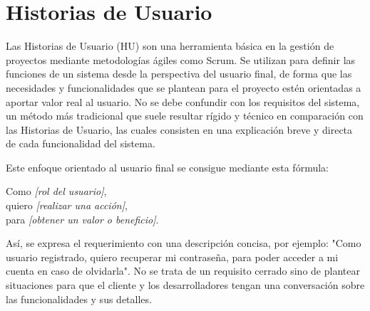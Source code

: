 ﻿\section{Historias de Usuario}

Las Historias de Usuario (HU) son una herramienta básica en la gestión de proyectos mediante metodologías ágiles como Scrum. Se utilizan para definir las funciones de un sistema desde la perspectiva del usuario final, de forma que las necesidades y funcionalidades que se plantean para el proyecto estén orientadas a aportar valor real al usuario. No se debe confundir con los requisitos del sistema, un método más tradicional que suele resultar rígido y técnico en comparación con las Historias de Usuario, las cuales consisten en una explicación breve y directa de cada funcionalidad del sistema.\cite{atlassian_user_stories}

Este enfoque orientado al usuario final se consigue mediante esta fórmula:

    \indent \indent Como \textit{[rol del usuario]}, \\
    \indent \indent quiero \textit{[realizar una acción]}, \\
    \indent \indent para \textit{[obtener un valor o beneficio]}.


Así, se expresa el requerimiento con una descripción concisa, por ejemplo: "Como usuario registrado, quiero recuperar mi contraseña, para poder acceder a mi cuenta en caso de olvidarla". No se trata de un requisito cerrado sino de plantear situaciones para que el cliente y los desarrolladores tengan una conversación sobre las funcionalidades y sus detalles.

